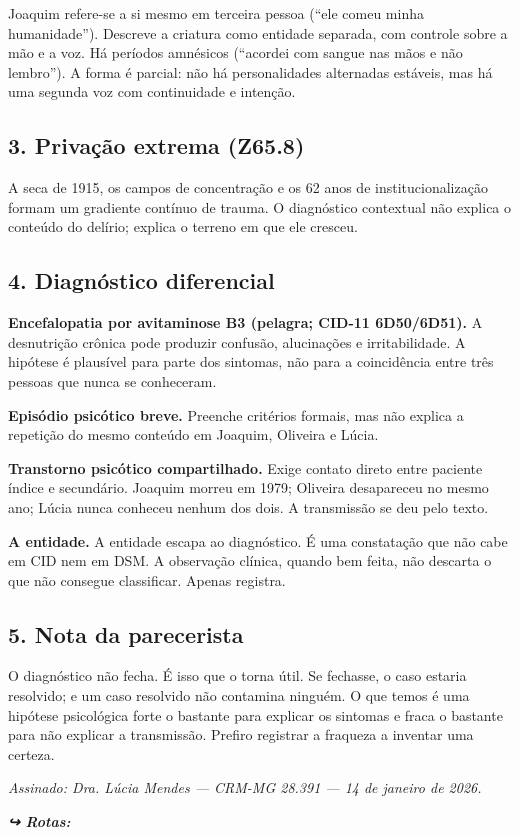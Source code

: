 \noindent Joaquim refere-se a si mesmo em terceira pessoa (``ele comeu minha humanidade''). Descreve a criatura como entidade separada, com controle sobre a mão e a voz. Há períodos amnésicos (``acordei com sangue nas mãos e não lembro''). A forma é parcial: não há personalidades alternadas estáveis, mas há uma segunda voz com continuidade e intenção.

\subsection*{3. Privação extrema (Z65.8)}

\noindent A seca de 1915, os campos de concentração e os 62 anos de institucionalização formam um gradiente contínuo de trauma. O diagnóstico contextual não explica o conteúdo do delírio; explica o terreno em que ele cresceu.

\subsection*{4. Diagnóstico diferencial}

\noindent \textbf{Encefalopatia por avitaminose B3 (pelagra; CID-11 6D50/6D51).} A desnutrição crônica pode produzir confusão, alucinações e irritabilidade. A hipótese é plausível para parte dos sintomas, não para a coincidência entre três pessoas que nunca se conheceram.

\noindent \textbf{Episódio psicótico breve.} Preenche critérios formais, mas não explica a repetição do mesmo conteúdo em Joaquim, Oliveira e Lúcia.

\noindent \textbf{Transtorno psicótico compartilhado.} Exige contato direto entre paciente índice e secundário. Joaquim morreu em 1979; Oliveira desapareceu no mesmo ano; Lúcia nunca conheceu nenhum dos dois. A transmissão se deu pelo texto.

\noindent \textbf{A entidade.} A entidade escapa ao diagnóstico. É uma constatação que não cabe em CID nem em DSM. A observação clínica, quando bem feita, não descarta o que não consegue classificar. Apenas registra.

\subsection*{5. Nota da parecerista}

\noindent O diagnóstico não fecha. É isso que o torna útil. Se fechasse, o caso estaria resolvido; e um caso resolvido não contamina ninguém. O que temos é uma hipótese psicológica forte o bastante para explicar os sintomas e fraca o bastante para não explicar a transmissão. Prefiro registrar a fraqueza a inventar uma certeza.

\noindent \textit{Assinado: Dra. Lúcia Mendes --- CRM-MG 28.391 --- 14 de janeiro de 2026.}

\noindent\textit{\textbf{↪ Rotas:}  \rotasep {} \rotasep {}}
